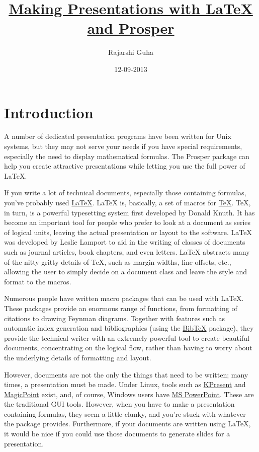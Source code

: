 \documentclass[a4paper,12pt,final,notitlepage]{article}
\author{Rajarshi Guha}
\title{\href{http://freecode.com/articles/making-presentations-with-latex-and-prosper}%
       {Making Presentations with LaTeX and Prosper}}
\date{12-09-2013}
\begin{document}
\section{Introduction}

  A number of dedicated presentation programs have been written for Unix
systems, but they may not serve your needs if you have special
requirements, especially the need to display mathematical formulas.
The Prosper package can help you create attractive presentations while
letting you use the full power of LaTeX.



If you write a lot of technical documents, especially those containing
formulas, you've probably used 
\href{http://freshmeat.net/projects/latex/}{\LaTeX}.  LaTeX is,
basically, a set of macros for 
\href{http://freshmeat.net/projects/tetex/}{\TeX}. TeX, in turn, is
a powerful typesetting system first developed by Donald Knuth. It has
become an important tool for people who prefer to look at a document
as series of logical units, leaving the actual presentation or layout
to the software. LaTeX was developed by Leslie Lamport to aid in the
writing of classes of documents such as journal articles, book
chapters, and even letters. LaTeX abstracts many of the nitty gritty
details of TeX, such as margin widths, line offsets, etc., allowing
the user to simply decide on a document class and leave the style and
format to the macros.



Numerous people have written macro packages that can be used with LaTeX.
These packages provide an enormous range of functions, from formatting
of citations to drawing Feynman diagrams. Together with features such as
automatic index generation and bibliographies (using the 
\href{http://www.ecst.csuchico.edu/~jacobsd/bib/formats/bibtex.html}{Bib\TeX}
package), they provide the technical writer with an extremely powerful
tool to create beautiful documents, concentrating on the logical flow,
rather than having to worry about the underlying details of formatting
and layout.


However, documents are not the only the things that need to be
written; many times, a presentation must be made. Under Linux, tools
such as \href{http://freshmeat.net/projects/koffice/}{KPresent} and
\href{http://freshmeat.net/projects/magicpoint/}{MagicPoint} exist, and, of
course, Windows users have 
\href{http://www.microsoft.com/office/powerpoint/default.asp}{MS
PowerPoint}. These are the traditional GUI tools. However, when you
have to make a presentation containing formulas, they seem a little
clunky, and you're stuck with whatever the package
provides. Furthermore, if your documents are written using LaTeX, it
would be nice if you could use those documents to generate slides for
a presentation.
\end{document}
